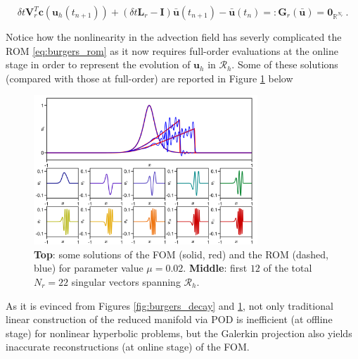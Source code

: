 \documentclass[../main.tex]{subfiles}
\begin{document}
\begin{equation}\label{eq:burgers_rom}
        \delta t \boldsymbol{V}_{r}^{T}\boldsymbol{c}(\boldsymbol{u}_{h}(t_{n+1})) + (\delta t \boldsymbol{L}_{r} - \boldsymbol{I})\bar{\boldsymbol{u}}(t_{n+1}) - \bar{\boldsymbol{u}}(t_{n}) =: \boldsymbol{G}_{r}(\bar{\boldsymbol{u}}) = \boldsymbol{0}_{\mathbb{R}^{N_{r}}} \,.
\end{equation}

Notice how the nonlinearity in the advection field has severly complicated the ROM \eqref{eq:burgers_rom} as it now requires full-order evaluations at the online stage in order to represent the evolution of $\boldsymbol{u}_{h}$ in $\mathcal{R}_{h}$.
Some of these solutions (compared with those at full-order) are reported in Figure \ref{fig:burgers_rom} below

\begin{figure}[H]
    \centering 
    \includegraphics[keepaspectratio, width=0.75\textwidth]{../figures/fig:burgers_rom.png}
    \caption{\textbf{Top}: some solutions of the FOM (solid, red) and the ROM (dashed, blue) for parameter value $\mu = 0.02$.
             \textbf{Middle}: first $12$ of the total $N_{r}=22$ singular vectors spanning $\mathcal{R}_{h}$.}
    \label{fig:burgers_rom}
\end{figure}

As it is evinced from Figures \ref{fig:burgers_decay} and \ref{fig:burgers_rom}, not only traditional linear construction of the reduced manifold via POD is inefficient (at offline stage) for nonlinear hyperbolic problems, but the Galerkin projection also yields inaccurate reconstructions (at online stage) of the FOM.
\end{document}

